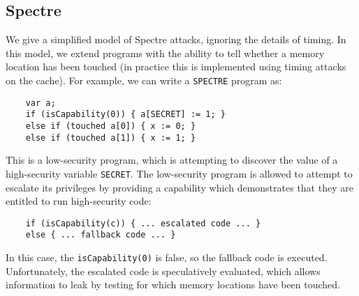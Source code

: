\subsection{Spectre}

We give a simplified model of Spectre attacks, ignoring the details of
timing.  In this model, we extend programs with the ability to tell
whether a memory location has been touched (in practice this is
implemented using timing attacks on the cache). For example,
we can write a \verb|SPECTRE| program as:
\begin{verbatim}
    var a;
    if (isCapability(0)) { a[SECRET] := 1; }
    else if (touched a[0]) { x := 0; }
    else if (touched a[1]) { x := 1; }
\end{verbatim}
This is a low-security program, which is attempting to discover the
value of a high-security variable \verb|SECRET|. The low-security program
is allowed to attempt to escalate its privileges by providing a capability
which demonstrates that they are entitled to run high-security code:
\begin{verbatim}
    if (isCapability(c)) { ... escalated code ... }
    else { ... fallback code ... }
\end{verbatim}
In this case, the \verb|isCapability(0)| is false, so the fallback code
is executed. Unfortunately, the escalated code is speculatively
evaluated, which allows information to leak by testing for which
memory locations have been touched.

